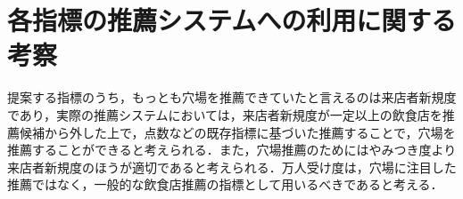 \section{各指標の推薦システムへの利用に関する考察}
提案する指標のうち，もっとも穴場を推薦できていたと言えるのは来店者新規度であり，実際の推薦システムにおいては，来店者新規度が一定以上の飲食店を推薦候補から外した上で，点数などの既存指標に基づいた推薦することで，穴場を推薦することができると考えられる．また，穴場推薦のためにはやみつき度より来店者新規度のほうが適切であると考えられる．万人受け度は，穴場に注目した推薦ではなく，一般的な飲食店推薦の指標として用いるべきであると考える．
